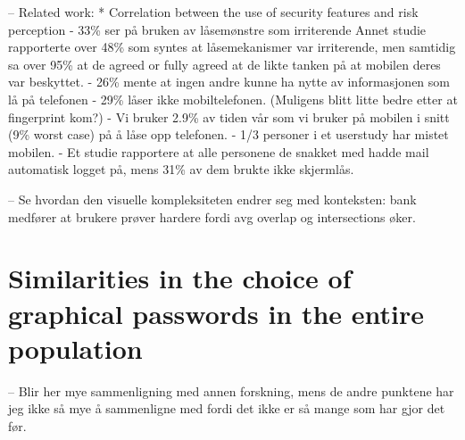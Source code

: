        -- Related work:
            * Correlation between the use of security features and risk perception 
                - 33\% ser på bruken av låsemønstre som irriterende
                    Annet studie rapporterte over 48\% som syntes at låsemekanismer var irriterende, men samtidig
                    sa over 95\% at de agreed or fully agreed at de likte tanken på at mobilen deres var beskyttet. 
                - 26\% mente at ingen andre kunne ha nytte av informasjonen som lå på telefonen
                - 29\% låser ikke mobiltelefonen. (Muligens blitt litte bedre etter at fingerprint kom?)
                - Vi bruker 2.9\% av tiden vår som vi bruker på mobilen i snitt (9\% worst case) på å låse opp telefonen. 
                - 1/3 personer i et userstudy har mistet mobilen. 
                - Et studie rapportere at alle personene de snakket med hadde mail automatisk logget på, mens 31\% av dem brukte ikke skjermlås.

        -- Se hvordan den visuelle kompleksiteten endrer seg med konteksten: bank medfører at brukere prøver hardere fordi avg overlap og intersections øker. 

    \section{Similarities in the choice of graphical passwords in the entire population}
        -- Blir her mye sammenligning med annen forskning, mens de andre punktene har jeg ikke så mye å sammenligne med fordi det ikke er så mange som har gjor det før.
